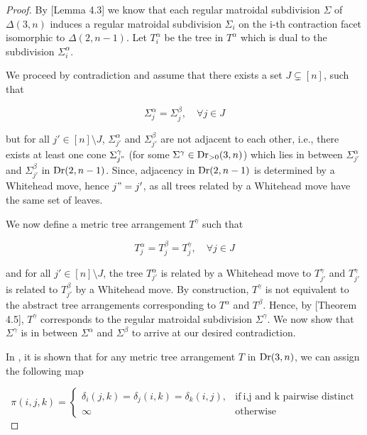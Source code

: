 \documentclass[12pt]{article}
\DeclareMathOperator{\Dr}{\rm Dr}
\theoremstyle{plain}
\theoremstyle{definition}
\numberwithin{subcase}{case}
\begin{document}
\begin{proof}
By \cite{herrmann2009draw}[Lemma 4.3] we know that each regular matroidal subdivision $\Sigma$ of $\Delta(3,n)$ induces a regular matroidal subdivision $\Sigma_{i}$ on the i-th contraction facet isomorphic to $\Delta(2,n-1)$. Let $T^{\alpha}_{i}$ be the tree in $T^{\alpha}$ which is dual to the subdivision $\Sigma^{\alpha}_{i}$. 

We proceed by contradiction and assume that there exists a set $J \subsetneq [n]$, such that 

\[ \Sigma^{\alpha}_{j} = \Sigma^{\beta}_{j}, \quad \forall j \in J \]

but for all $j' \in [n] \setminus J$,  $\Sigma^{\alpha}_{j'}$ and $\Sigma^{\beta}_{j'}$ are not adjacent to each other, i.e., there exists at least one cone $\Sigma^{\gamma}_{j"}$ (for some $\Sigma^{\gamma} \in \Dr_{> 0}(3,n)$) which lies in between  $\Sigma^{\alpha}_{j'}$ and $\Sigma^{\beta}_{j'}$ in $\Dr(2,n-1)$. Since, adjacency in $\Dr(2,n-1)$ is determined by a Whitehead move, hence $j" = j'$, as all trees related by a Whitehead move have the same set of leaves. 

We now define a metric tree arrangement $T^{\gamma}$ such that 

\[ T^{\alpha}_{j} = T^{\beta}_{j} = T^{\gamma}_{j}, \quad \forall j \in J \]

and for all $j' \in [n] \setminus J$, the tree $T^{\alpha}_{j'}$ is related by a Whitehead move to $T^{\gamma}_{j'}$ and $T^{\gamma}_{j'}$ is related to $T^{\beta}_{j'}$ by a Whitehead move. By construction, $T^{\gamma}$ is not equivalent to the abstract tree arrangements corresponding to $T^{\alpha}$ and $T^{\beta}$. Hence, by \cite{herrmann2009draw}[Theorem 4.5], $T^{\gamma}$ corresponds to the regular matroidal subdivision $\Sigma^{\gamma}$. We now show that $\Sigma^{\gamma}$ is in between $\Sigma^{\alpha}$ and $\Sigma^{\beta}$ to arrive at our desired contradiction.

In \cite{herrmann2009draw}, it is shown that for any metric tree arrangement $T$ in $\Dr(3,n)$, we can assign the following map 

\begin{equation*}
    \pi(i,j,k) =
    \begin{cases}
      \delta_{i}(j,k) = \delta_{j}(i,k) = \delta_{k}(i,j), & \text{if}\ \text{i,j and k pairwise distinct} \\
      \infty & \text{otherwise}
    \end{cases}
  \end{equation*}


\end{proof}
\end{document}
